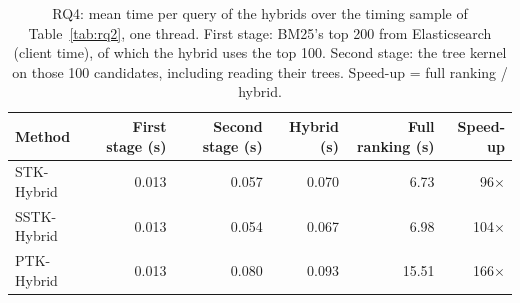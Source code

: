 \begin{table}[!htbp]
\centering
\caption{RQ4: mean time per query of the hybrids over the timing sample of Table~\ref{tab:rq2}, one thread. First stage: BM25's top 200 from Elasticsearch (client time), of which the hybrid uses the top 100. Second stage: the tree kernel on those 100 candidates, including reading their trees. Speed-up = full ranking / hybrid.}
\label{tab:hybridcost}
\footnotesize
\setlength{\tabcolsep}{4pt}
\begin{tabular}{lrrrrr}
\toprule
Method & First stage (s) & Second stage (s) & Hybrid (s) & Full ranking (s) & Speed-up \\
\midrule
STK-Hybrid & 0.013 & 0.057 & 0.070 & 6.73 & 96$\times$ \\
SSTK-Hybrid & 0.013 & 0.054 & 0.067 & 6.98 & 104$\times$ \\
PTK-Hybrid & 0.013 & 0.080 & 0.093 & 15.51 & 166$\times$ \\
\bottomrule
\end{tabular}
\end{table}
